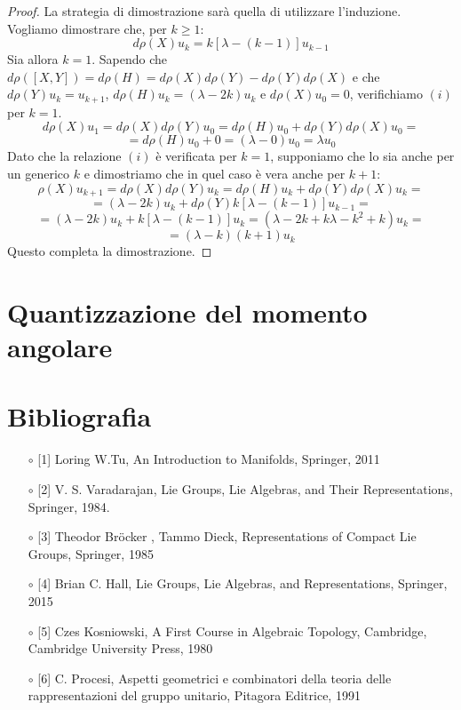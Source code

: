 \documentclass[12pt,a4paper]{report}
\theoremstyle{definition}
\theoremstyle{definition}
\theoremstyle{definition}
\theoremstyle{definition}
\begin{document}
\begin{proof}
	La strategia di dimostrazione sarà quella di utilizzare l'induzione.
	Vogliamo dimostrare che, per $k\geq 1$:
	\begin{equation}
		\label{eq:4}
		d\rho(X)u_k=k[\lambda-(k-1)]u_{k-1} 
\tag{i}
\end{equation}
	Sia allora $k=1$. Sapendo che $d\rho([X,Y])=d\rho(H)=d\rho(X)d\rho(Y)-d\rho(Y)d\rho(X)$ e che $d\rho(Y)u_k=u_{k+1}$, $d\rho(H)u_k=(\lambda-2k)u_k$ e $d\rho(X)u_0=0$, verifichiamo $(i)$ per $k=1$.
	$$d\rho(X)u_1=d\rho(X)d\rho(Y)u_0=d\rho(H)u_0+d\rho(Y)d\rho(X)u_0=$$$$=d\rho(H)u_0+0=(\lambda-0)u_0=\lambda u_0$$
	Dato che la relazione $(i)$ è verificata per $k=1$, supponiamo che lo sia anche per un generico $k$ e dimostriamo che in quel caso è vera anche per $k+1$:
	$$\rho(X)u_{k+1}=d\rho(X)d\rho(Y)u_{k}=d\rho(H)u_k+d\rho(Y)d\rho(X)u_k=$$
	$$=(\lambda-2k)u_k+d\rho(Y)k[\lambda-(k-1)]u_{k-1}=$$ 
	$$=(\lambda-2k)u_k+k[\lambda-(k-1)]u_{k}=(\lambda-2k+k\lambda-k^2+k)u_k=$$
	$$=(\lambda-k)(k+1)u_k$$
	Questo completa la dimostrazione.
\end{proof}
\chapter{Quantizzazione del momento angolare}
\chapter*{Bibliografia}
\begin{itemize}
	\item[$\circ$] [1] Loring W.Tu, An Introduction to Manifolds, Springer, 2011
	\item[$\circ$] [2] V. S. Varadarajan, Lie Groups, Lie Algebras, and Their Representations, Springer,
	1984.
	\item[$\circ$] [3] Theodor Bröcker , Tammo Dieck, Representations of Compact Lie Groups, Springer, 1985
	\item[$\circ$] [4] Brian C. Hall, Lie Groups, Lie Algebras, and Representations, Springer, 2015
	\item [$\circ$] [5] Czes Kosniowski, A First Course in Algebraic Topology, Cambridge, Cambridge University Press, 1980
	\item [$\circ$] [6] C. Procesi, Aspetti geometrici e combinatori della teoria delle rappresentazioni del gruppo unitario, Pitagora Editrice, 1991
\end{itemize}
\end{document}
